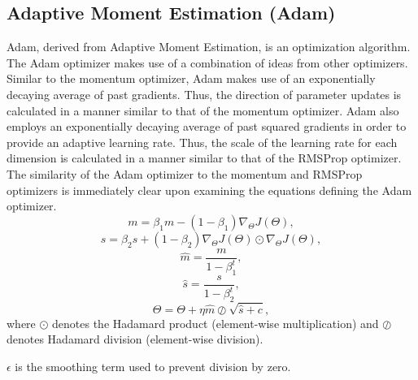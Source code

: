 \subsection{Adaptive Moment Estimation (Adam)}
\FloatBarrier
Adam, derived from Adaptive Moment Estimation, is an optimization algorithm.
The Adam optimizer makes use of a combination of ideas from other optimizers.
Similar to the momentum optimizer, Adam makes use of an exponentially decaying average of 
past gradients.
Thus, the direction of parameter updates is calculated in a manner similar to that of
the momentum optimizer.
Adam also employs an exponentially decaying average of past squared gradients in order to
provide an adaptive learning rate. 
Thus, the scale of the learning rate for each dimension is calculated in a manner similar to 
that of the RMSProp optimizer.
The similarity of the Adam optimizer to the momentum and RMSProp optimizers is
immediately clear upon examining the equations defining the Adam optimizer.
\begin{equation}
	m = \beta_{1}m - (1-\beta_{1})\nabla_{\Theta}J(\Theta),
\end{equation}
\begin{equation}
	s = \beta_{2}s+(1-\beta_{2})\nabla_{\Theta}J(\Theta)\odot \nabla_{\Theta}J(\Theta),
\end{equation}
\begin{equation}
	\hat{m} = \frac{m}{1-\beta^{t}_{1}},
\end{equation}
\begin{equation}
	\hat{s} = \frac{s}{1-\beta^{t}_{2}},
\end{equation}
\begin{equation}
	\Theta = \Theta + \eta \hat{m} \oslash \sqrt{\hat{s}+c},
\end{equation}
where $\odot$ denotes the Hadamard product (element-wise multiplication) and $\oslash$ denotes
Hadamard division (element-wise division).

$\epsilon$ is the smoothing term used to prevent division by zero.

